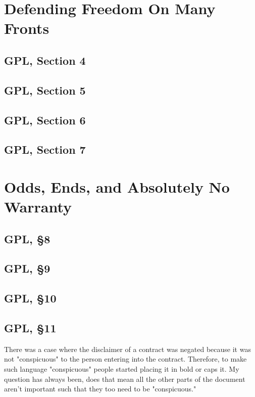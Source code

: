 \documentclass[12pt]{report}
\begin{document}
\chapter{Defending Freedom On Many Fronts}

\section{GPL, Section 4}
\label{GPLs4}

\section{GPL, Section 5}
\label{GPLs5}

\section{GPL, Section 6}
\label{GPLs6}

\section{GPL, Section 7}
\label{GPLs7}

\chapter{Odds, Ends, and Absolutely No Warranty}

\section{GPL, \S 8}
\label{GPLs8}

\section{GPL, \S 9}
\label{GPLs9}

\section{GPL, \S 10}
\label{GPLs10}

\section{GPL, \S 11}
\label{GPLs11}

There was a case where the disclaimer of a contract was negated because it
was not "conspicuous" to the person entering into the contract.  Therefore,
to make such language "conspicuous" people started placing it in bold or caps it.  My question
has always been, does that mean all the other parts of the document aren't
important such that they too need to be "conspicuous."
\end{document}
